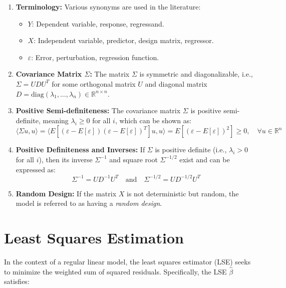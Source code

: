 \documentclass[open=any, 11pt,paper=A4]{scrreprt}
\begin{document}
\begin{remark}
    \begin{enumerate}
        \item \textbf{Terminology:} Various synonyms are used in the literature:
        \begin{itemize}
            \item \( Y \): Dependent variable, response, regressand.
            \item \( X \): Independent variable, predictor, design matrix, regressor.
            \item \( \varepsilon \): Error, perturbation, regression function.
        \end{itemize}
        \item \textbf{Covariance Matrix \( \Sigma \):} The matrix \( \Sigma \) is symmetric and diagonalizable, i.e., \( \Sigma = UDU^T \) for some orthogonal matrix \( U \) and diagonal matrix \( D = \text{diag}(\lambda_1, \ldots, \lambda_n) \in \mathbb{R}^{n \times n} \).
        \item \textbf{Positive Semi-definiteness:} The covariance matrix \( \Sigma \) is positive semi-definite, meaning \( \lambda_i \ge 0 \) for all \( i \), which can be shown as:
        \[
        \langle \Sigma u, u \rangle = \langle E[(\varepsilon - E[\varepsilon])(\varepsilon - E[\varepsilon])^T]u, u \rangle = E[(\varepsilon - E[\varepsilon])^2] \ge 0, \quad \forall u \in \mathbb{R}^n
        \]
        \item \textbf{Positive Definiteness and Inverses:} If \( \Sigma \) is positive definite (i.e., \( \lambda_i > 0 \) for all \( i \)), then its inverse \( \Sigma^{-1} \) and square root \( \Sigma^{-1/2} \) exist and can be expressed as:
        \[
        \Sigma^{-1} = UD^{-1}U^T \quad \text{and} \quad \Sigma^{-1/2} = UD^{-1/2}U^T
        \]
        \item \textbf{Random Design:} If the matrix \( X \) is not deterministic but random, the model is referred to as having a \emph{random design}.
    \end{enumerate}
\end{remark}

\section{Least Squares Estimation}

In the context of a regular linear model, the least squares estimator (LSE) seeks to minimize the weighted sum of squared residuals. Specifically, the LSE \( \hat{\beta} \) satisfies:
\end{document}
